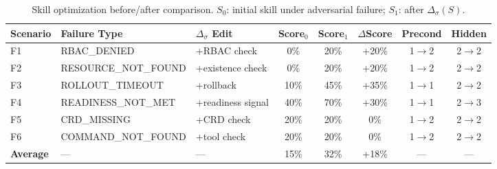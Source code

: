 \documentclass[conference,10pt]{IEEEtran}
\begin{document}
\begin{table}[t]
\centering
\caption{Skill optimization before/after comparison. $S_0$: initial skill under adversarial failure; $S_1$: after $\Delta_\sigma(S)$.}
\label{tab:optimization}
\small
\begin{tabular}{lllccccc}
\toprule
\textbf{Scenario} & \textbf{Failure Type} & \textbf{$\Delta_\sigma$ Edit} & \textbf{Score$_0$} & \textbf{Score$_1$} & \textbf{$\Delta$Score} & \textbf{Precond} & \textbf{Hidden} \\
\midrule
F1 & RBAC\_DENIED & +RBAC check & 0\% & 20\% & +20\% & 1$\to$2 & 2$\to$2 \\
F2 & RESOURCE\_NOT\_FOUND & +existence check & 0\% & 20\% & +20\% & 1$\to$2 & 2$\to$2 \\
F3 & ROLLOUT\_TIMEOUT & +rollback & 10\% & 45\% & +35\% & 1$\to$1 & 2$\to$2 \\
F4 & READINESS\_NOT\_MET & +readiness signal & 40\% & 70\% & +30\% & 1$\to$1 & 2$\to$3 \\
F5 & CRD\_MISSING & +CRD check & 20\% & 20\% & 0\% & 1$\to$2 & 2$\to$2 \\
F6 & COMMAND\_NOT\_FOUND & +tool check & 20\% & 20\% & 0\% & 1$\to$2 & 2$\to$2 \\
\midrule
\textbf{Average} & --- & --- & 15\% & 32\% & +18\% & --- & --- \\
\bottomrule
\end{tabular}
\end{table}
\end{document}
